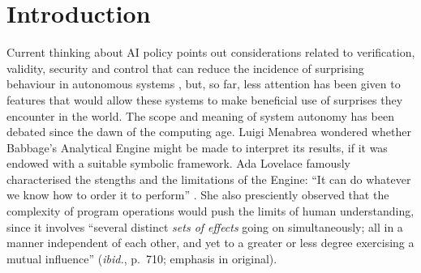 \ifdraft{\tableofcontents
\clearpage
}{}

\section{Introduction} \label{sec:why-this-matters}
Current thinking about AI policy points out considerations related to verification, validity, security and control that can reduce the incidence of surprising behaviour in autonomous systems \cite{research-priorities}, but, so far, less attention has been given to features that would allow these systems to make beneficial use of surprises they encounter in the world. 
%
The scope and meaning of system autonomy has been debated since the dawn of the computing age.  Luigi Menabrea \cite[p.~689]{menabrea1842sketch} wondered whether Babbage's Analytical Engine might be made to interpret its results, if it was endowed with a suitable symbolic framework.
Ada Lovelace famously characterised the stengths and the limitations of the Engine: ``It can do whatever we know how to order it to perform'' \cite[p.~722]{lovelace}.  She also presciently observed that the complexity of program operations would push the limits of human understanding, since it involves ``several distinct \emph{sets of effects} going on simultaneously; all in a manner independent of each other, and yet to a greater or less degree exercising a mutual influence'' (\emph{ibid.}, p.~710; emphasis in original).

